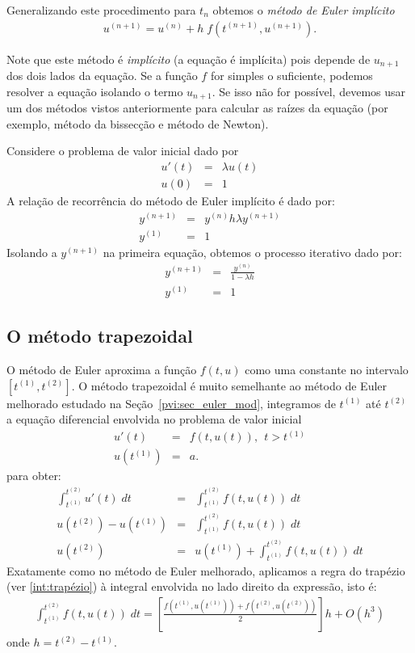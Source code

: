 Generalizando este procedimento para $t_n$ obtemos o \emph{método de Euler implícito}
\begin{eqnarray}
u^{(n+1)}=u^{(n)} + h\;f(t^{(n+1)},u^{(n+1)}).
\end{eqnarray}


Note que este método é \emph{implícito} (a equação é implícita) pois depende de $u_{n+1}$ dos dois lados da equação. Se a função $f$ for simples o suficiente, podemos resolver a equação isolando o termo $u_{n+1}$. Se isso não for possível, devemos usar um dos métodos vistos anteriormente para calcular as raízes da equação (por exemplo, método da bissecção e método de Newton).

\begin{ex} Considere o problema de valor inicial dado por
\begin{eqnarray}
u'(t)&=& \lambda u(t) \\
u(0)&=&1
\end{eqnarray}
A relação de recorrência do método de Euler implícito é dado por:
\begin{eqnarray*}
 y^{(n+1)}&=&y^{(n)} h\lambda y^{(n+1)}\\
 y^{(1)}&=&1
\end{eqnarray*}
Isolando a $y^{(n+1)}$ na primeira equação, obtemos o processo iterativo dado por:
\begin{eqnarray*}
 y^{(n+1)}&=&\frac{y^{(n)}}{1-\lambda h}\\
 y^{(1)}&=&1
\end{eqnarray*}
\end{ex}


\subsection{O método trapezoidal}\label{pvi:trapezoidal}
O método de Euler aproxima a função $f(t,u)$ como uma constante no intervalo $[t^{(1)},t^{(2)}]$. O método trapezoidal é muito semelhante ao método de Euler melhorado estudado na Seção~\ref{pvi:sec_euler_mod}, integramos de $t^{(1)}$ até $t^{(2)}$ a equação diferencial envolvida no problema de valor inicial
\begin{eqnarray}\label{EDO}
  u'(t)  &=& f(t,u(t)),~~t>t^{(1)} \\
  u(t^{(1)}) &=& a.
\end{eqnarray}
para obter:
\begin{eqnarray}
  \int_{t^{(1)}}^{t^{(2)}} u'(t) \;dt &=& \int_{t^{(1)}}^{t^{(2)}} f(t,u(t)) \; dt\\
  u(t^{(2)})-u(t^{(1)})               &=& \int_{t^{(1)}}^{t^{(2)}} f(t,u(t)) \; dt\\
  u(t^{(2)})                      &=& u(t^{(1)}) +  \int _{t^{(1)}}^{t^{(2)}} f(t,u(t)) \; dt
\end{eqnarray}
Exatamente como no método de Euler melhorado, aplicamos a regra do trapézio (ver \ref{int:trapézio}) à integral envolvida no lado direito da expressão, isto é:
\begin{eqnarray*}
\int _{t^{(1)}}^{t^{(2)}} f(t,u(t)) \; dt = \left[\frac{f\left(t^{(1)},u(t^{(1)})\right)+f\left(t^{(2)},u(t^{(2)})\right)}{2}\right]h + O(h^3)
\end{eqnarray*}
onde $h=t^{(2)}-t^{(1)}$.


